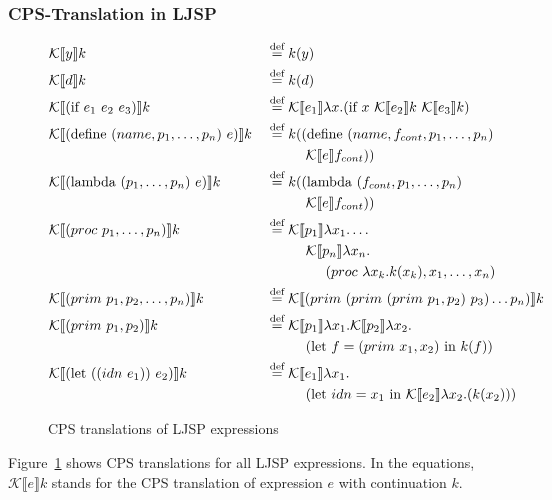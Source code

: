 \documentclass[11pt]{report}
\newcommand{\eqdef}{\stackrel{\text{def}}{=}}%
\newcommand{\cpstrans}[1]{\ensuremath{\mathcal{K}\llbracket #1 \rrbracket}}
\begin{document}
\subsubsection{CPS-Translation in LJSP}
\begin{figure}[ht]
\begin{alignat*}{2}
&\cpstrans{y} k &&\eqdef k(y) \\
%
&\cpstrans{d} k &&\eqdef k(d) \\
%
&\cpstrans{(\text{if}\ e_1\ e_2\ e_3)} k &&\eqdef \cpstrans{e_1} \lambda x.(\text{if}\ x\ \cpstrans{e_2}k\ \cpstrans{e_3}k) \\
%
&\cpstrans{(\text{define}\ (name, p_1, \dots, p_n)\ e)} k &&\eqdef k((\text{define}\ (name, f_{cont}, p_1, \dots, p_n)\ \\
&&&\hspace{1cm}\cpstrans{e}f_{cont})) \\
%
&\cpstrans{(\text{lambda}\ (p_1, \dots, p_n)\ e)} k &&\eqdef k((\text{lambda}\ (f_{cont}, p_1, \dots, p_n)\ \\
&&&\hspace{1cm}\cpstrans{e}f_{cont})) \\
%
&\cpstrans{(proc\ p_1, \dots, p_n)} k &&\eqdef \cpstrans{p_1} \lambda x_1. \dots  \\
&&&\hspace{1 cm}\cpstrans{p_n} \lambda x_n.\\
&&&\hspace{1.5 cm}(proc\ \lambda x_k.k(x_k), x_1, \dots, x_n) \\
%
&\cpstrans{(prim\ p_1, p_2, \dots, p_n)} k &&\eqdef \cpstrans{(prim\ (prim\ (prim\ p_1, p_2)\ p_3) \dots p_n)} k\\
%
&\cpstrans{(prim\ p_1, p_2)} k &&\eqdef \cpstrans{p_1}\lambda x_1. \cpstrans{p_2}\lambda x_2.\\
&&&\hspace{1cm}(\text{let}\ f=(prim\ x_1, x_2)\ \text{in}\ k(f))\\
%
&\cpstrans{(\text{let}\ ((idn\ e_1))\ e_2)} k &&\eqdef \cpstrans{e_1} \lambda x_1. \\
&&&\hspace{1 cm}(\text{let}\ idn = x_1\ \text{in}\ \cpstrans{e_2} \lambda x_2.(k(x_2)))
\end{alignat*}
\caption{CPS translations of LJSP expressions}
\label{cpstrans}
\end{figure}

Figure~\ref{cpstrans} shows CPS translations for all LJSP expressions. In the equations, $\cpstrans{e} k$ stands for the CPS translation of expression $e$ with continuation $k$.
\end{document}
